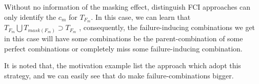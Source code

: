 \documentclass{sig-alternate}
\begin{document}
Without no information of the masking effect, distinguish FCI approaches can only identify the $c_{m}$ for $T_{F_{m}}$. In this case, we can learn that $T_{F_{m}} \bigcup T_{mask(F_{m})} \supset T_{F_{m}} $ , consequently, the failure-inducing combinations we get in this case will have some combinations be the parent-combination of some perfect combinations or completely miss some failure-inducing combination.

It is noted that, the motivation example list the approach which adopt this strategy, and we can easily see that do make failure-combinations bigger.

%
%
%
%
%
%
\end{document}
